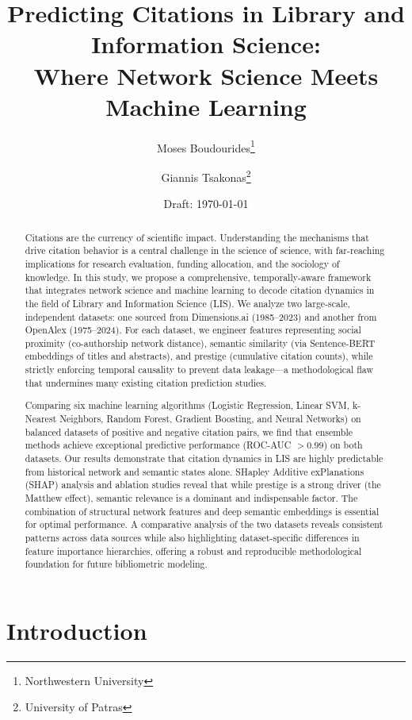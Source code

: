 \documentclass[12pt,a4paper]{article}
\title{\textbf{Predicting Citations in Library and Information Science:\\
Where Network Science Meets Machine Learning}}
\author{Moses Boudourides\thanks{Northwestern University} \and Giannis Tsakonas\thanks{University of Patras}}
\date{Draft: \today}
\begin{document}
\maketitle

\begin{abstract}
Citations are the currency of scientific impact. Understanding the mechanisms that drive citation behavior is a central challenge in the science of science, with far-reaching implications for research evaluation, funding allocation, and the sociology of knowledge. In this study, we propose a comprehensive, temporally-aware framework that integrates network science and machine learning to decode citation dynamics in the field of Library and Information Science (LIS). We analyze two large-scale, independent datasets: one sourced from Dimensions.ai (1985--2023) and another from OpenAlex (1975--2024). For each dataset, we engineer features representing social proximity (co-authorship network distance), semantic similarity (via Sentence-BERT embeddings of titles and abstracts), and prestige (cumulative citation counts), while strictly enforcing temporal causality to prevent data leakage---a methodological flaw that undermines many existing citation prediction studies.

Comparing six machine learning algorithms (Logistic Regression, Linear SVM, k-Nearest Neighbors, Random Forest, Gradient Boosting, and Neural Networks) on balanced datasets of positive and negative citation pairs, we find that ensemble methods achieve exceptional predictive performance (ROC-AUC $> 0.99$) on both datasets. Our results demonstrate that citation dynamics in LIS are highly predictable from historical network and semantic states alone. SHapley Additive exPlanations (SHAP) analysis and ablation studies reveal that while prestige is a strong driver (the Matthew effect), semantic relevance is a dominant and indispensable factor. The combination of structural network features and deep semantic embeddings is essential for optimal performance. A comparative analysis of the two datasets reveals consistent patterns across data sources while also highlighting dataset-specific differences in feature importance hierarchies, offering a robust and reproducible methodological foundation for future bibliometric modeling.
\end{abstract}

\newpage
\tableofcontents
\newpage

\section{Introduction}
\end{document}
